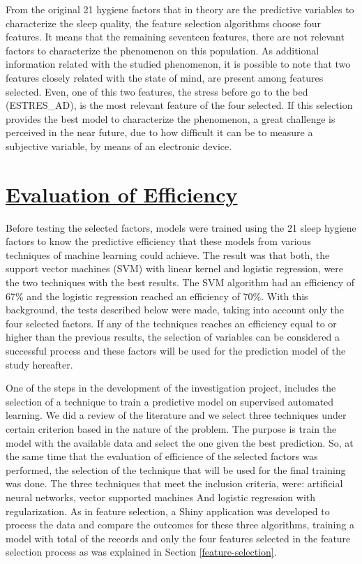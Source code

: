 \documentclass[]{book}
\begin{document}
From the original 21 hygiene factors that in theory are the predictive
variables to characterize the sleep quality, the feature selection
algorithms choose four features. It means that the remaining seventeen
features, there are not relevant factors to characterize the phenomenon
on this population. As additional information related with the studied
phenomenon, it is possible to note that two features closely related
with the state of mind, are present among features selected. Even, one
of this two features, the stress before go to the bed (ESTRES\_AD), is
the most relevant feature of the four selected. If this selection
provides the best model to characterize the phenomenon, a great
challenge is perceived in the near future, due to how difficult it can
be to measure a subjective variable, by means of an electronic device.

\chapter{\texorpdfstring{\protect\hyperlink{efficiency-evaluation}{Evaluation
of
Efficiency}}{Evaluation of Efficiency}}\label{evaluation-of-efficiency}

Before testing the selected factors, models were trained using the 21
sleep hygiene factors to know the predictive efficiency that these
models from various techniques of machine learning could achieve. The
result was that both, the support vector machines (SVM) with linear
kernel and logistic regression, were the two techniques with the best
results. The SVM algorithm had an efficiency of 67\% and the logistic
regression reached an efficiency of 70\%. With this background, the
tests described below were made, taking into account only the four
selected factors. If any of the techniques reaches an efficiency equal
to or higher than the previous results, the selection of variables can
be considered a successful process and these factors will be used for
the prediction model of the study hereafter.

One of the steps in the development of the investigation project,
includes the selection of a technique to train a predictive model on
supervised automated learning. We did a review of the literature and we
select three techniques under certain criterion based in the nature of
the problem. The purpose is train the model with the available data and
select the one given the best prediction. So, at the same time that the
evaluation of efficience of the selected factors was performed, the
selection of the technique that will be used for the final training was
done. The three techniques that meet the inclusion criteria, were:
artificial neural networks, vector supported machines And logistic
regression with regularization. As in feature selection, a Shiny
application was developed to process the data and compare the outcomes
for these three algorithms, training a model with total of the records
and only the four features selected in the feature selection process as
was explained in Section \ref{feature-selection}.
\end{document}
